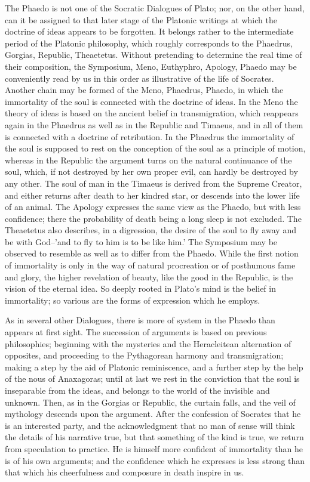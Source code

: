 The Phaedo is not one of the Socratic Dialogues of Plato; nor, on the
other hand, can it be assigned to that later stage of the Platonic
writings at which the doctrine of ideas appears to be forgotten. It
belongs rather to the intermediate period of the Platonic philosophy,
which roughly corresponds to the Phaedrus, Gorgias, Republic,
Theaetetus. Without pretending to determine the real time of their
composition, the Symposium, Meno, Euthyphro, Apology, Phaedo may be
conveniently read by us in this order as illustrative of the life of
Socrates. Another chain may be formed of the Meno, Phaedrus, Phaedo,
in which the immortality of the soul is connected with the doctrine of
ideas. In the Meno the theory of ideas is based on the ancient belief in
transmigration, which reappears again in the Phaedrus as well as in the
Republic and Timaeus, and in all of them is connected with a doctrine of
retribution. In the Phaedrus the immortality of the soul is supposed to
rest on the conception of the soul as a principle of motion, whereas in
the Republic the argument turns on the natural continuance of the soul,
which, if not destroyed by her own proper evil, can hardly be destroyed
by any other. The soul of man in the Timaeus is derived from the Supreme
Creator, and either returns after death to her kindred star, or descends
into the lower life of an animal. The Apology expresses the same view
as the Phaedo, but with less confidence; there the probability of death
being a long sleep is not excluded. The Theaetetus also describes, in a
digression, the desire of the soul to fly away and be with God--'and to
fly to him is to be like him.' The Symposium may be observed to
resemble as well as to differ from the Phaedo. While the first notion of
immortality is only in the way of natural procreation or of posthumous
fame and glory, the higher revelation of beauty, like the good in the
Republic, is the vision of the eternal idea. So deeply rooted in
Plato's mind is the belief in immortality; so various are the forms of
expression which he employs.

As in several other Dialogues, there is more of system in the Phaedo
than appears at first sight. The succession of arguments is based on
previous philosophies; beginning with the mysteries and the Heracleitean
alternation of opposites, and proceeding to the Pythagorean harmony and
transmigration; making a step by the aid of Platonic reminiscence, and
a further step by the help of the nous of Anaxagoras; until at last we
rest in the conviction that the soul is inseparable from the ideas,
and belongs to the world of the invisible and unknown. Then, as in
the Gorgias or Republic, the curtain falls, and the veil of mythology
descends upon the argument. After the confession of Socrates that he is
an interested party, and the acknowledgment that no man of sense will
think the details of his narrative true, but that something of the kind
is true, we return from speculation to practice. He is himself more
confident of immortality than he is of his own arguments; and the
confidence which he expresses is less strong than that which his
cheerfulness and composure in death inspire in us.

